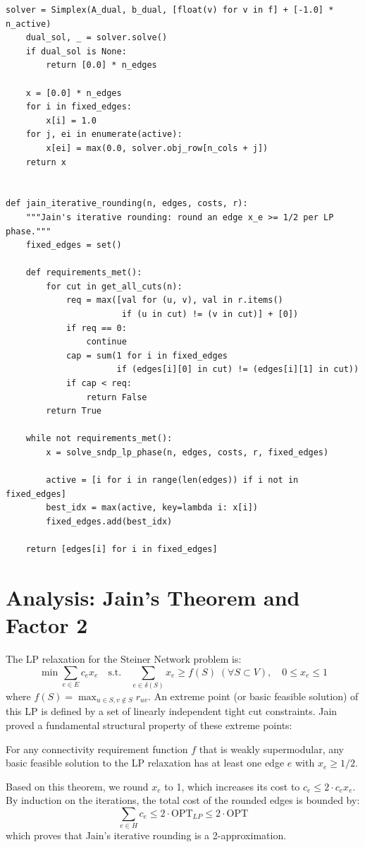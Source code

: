 \begin{lstlisting}[style=python, caption=Jain's Iterative Rounding Algorithm]
    solver = Simplex(A_dual, b_dual, [float(v) for v in f] + [-1.0] * n_active)
    dual_sol, _ = solver.solve()
    if dual_sol is None:
        return [0.0] * n_edges

    x = [0.0] * n_edges
    for i in fixed_edges:
        x[i] = 1.0
    for j, ei in enumerate(active):
        x[ei] = max(0.0, solver.obj_row[n_cols + j])
    return x


def jain_iterative_rounding(n, edges, costs, r):
    """Jain's iterative rounding: round an edge x_e >= 1/2 per LP phase."""
    fixed_edges = set()

    def requirements_met():
        for cut in get_all_cuts(n):
            req = max([val for (u, v), val in r.items()
                       if (u in cut) != (v in cut)] + [0])
            if req == 0:
                continue
            cap = sum(1 for i in fixed_edges
                      if (edges[i][0] in cut) != (edges[i][1] in cut))
            if cap < req:
                return False
        return True

    while not requirements_met():
        x = solve_sndp_lp_phase(n, edges, costs, r, fixed_edges)

        active = [i for i in range(len(edges)) if i not in fixed_edges]
        best_idx = max(active, key=lambda i: x[i])
        fixed_edges.add(best_idx)

    return [edges[i] for i in fixed_edges]
\end{lstlisting}

\section{Analysis: Jain's Theorem and Factor 2}
The LP relaxation for the Steiner Network problem is:
\[
\min \sum_{e \in E} c_e x_e \quad \text{s.t.} \quad \sum_{e \in \delta(S)} x_e \ge f(S) \; (\forall S \subset V), \quad 0 \le x_e \le 1
\]
where $f(S) = \max_{u \in S, v \notin S} r_{uv}$.
An extreme point (or basic feasible solution) of this LP is defined by a set of linearly independent tight cut constraints. Jain proved a fundamental structural property of these extreme points:
\begin{theorem}[Jain 1998]
For any connectivity requirement function $f$ that is weakly supermodular, any basic feasible solution to the LP relaxation has at least one edge $e$ with $x_e \ge 1/2$.
\end{theorem}
Based on this theorem, we round $x_e$ to 1, which increases its cost to $c_e \le 2 \cdot c_e x_e$. By induction on the iterations, the total cost of the rounded edges is bounded by:
\[
\sum_{e \in H} c_e \le 2 \cdot \text{OPT}_{LP} \le 2 \cdot \text{OPT}
\]
which proves that Jain's iterative rounding is a 2-approximation.

